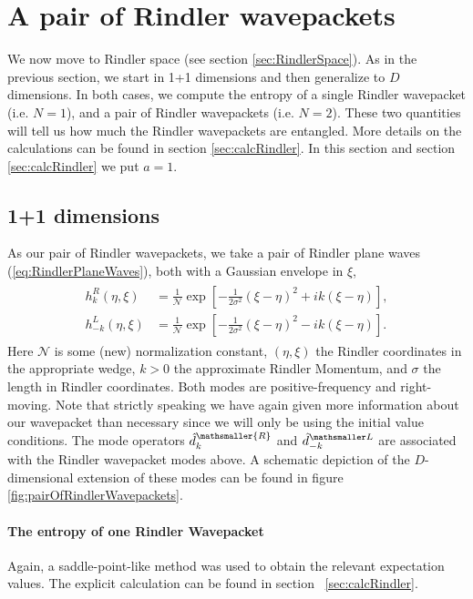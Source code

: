 \documentclass[11pt, a4paper]{article}
\newcommand{\si}{{\sigma}}
\newcommand{\mc}[1]{\mathcal{#1}}
\newcommand{\ms}{\mathsmaller}
\begin{document}
\section{A pair of Rindler wavepackets}
\label{sec:aPairOfRindlerWavepackets}
We now move to Rindler space (see section \ref{sec:RindlerSpace}). As in the previous section, we start in 1+1 dimensions and then generalize to $D$ dimensions. In both cases, we compute the entropy of a single Rindler wavepacket (i.e. $N=1$), and a pair of Rindler wavepackets (i.e. $N=2$). These two quantities will tell us how much the Rindler wavepackets are entangled. More details on the calculations can be found in section \ref{sec:calcRindler}. In this section and section \ref{sec:calcRindler} we put $a=1$.
\subsection{1+1 dimensions}
As our pair of Rindler wavepackets, we take a pair of Rindler plane waves (\ref{eq:RindlerPlaneWaves}), both with a Gaussian envelope in $\xi$,
\begin{align}
	\label{eq:rindlerWavepacket}
	\begin{aligned}
	h^R_{k}(\eta,\xi)&=\frac{1}{\mc N}\exp\left[-\frac{1}{2\si^ 2}(\xi-\eta)^2+ik(\xi-\eta)\right],\\
	h^L_{-k}(\eta,\xi)&=\frac{1}{\mc N}\exp\left[-\frac{1}{2\si^ 2}(\xi-\eta)^2-ik(\xi-\eta)\right]	.
	\end{aligned}
\end{align}
Here $\mc N$ is some (new) normalization constant, $(\eta,\xi)$ the Rindler coordinates in the appropriate wedge, $k>0$ the approximate Rindler Momentum, and $\si$ the length in Rindler coordinates. Both modes are positive-frequency and right-moving. Note that strictly speaking we have again given more information about our wavepacket than necessary since we will only be using the initial value conditions. The mode operators $\hat d^{\ms{R}}_k$ and $\hat d^{\ms L}_{-k}$ are associated with the Rindler wavepacket modes above. A schematic depiction of the $D$-dimensional extension of these modes can be found in figure \ref{fig:pairOfRindlerWavepackets}.

\paragraph{The entropy of one Rindler Wavepacket}
Again, a saddle-point-like method was used to obtain the relevant expectation values. The explicit calculation can be found in section~ \ref{sec:calcRindler}.
\end{document}
